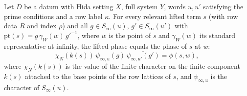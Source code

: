 \begin{proposition}\label{pf:thmS-leaves:prop:phase}
Let $D$ be a datum with Hida setting $X$, full system $Y$, words $u,u'$ satisfying the prime conditions and a row label $\kappa$. For every relevant
lifted term $s$ (with row data $R$ and index $\rho$) and all $g\in S_\infty(u)$, $g'\in S_\infty(u')$ with $\mathrm{pt}(s)=g\,\gamma_W(w)\,g'^{-1}$, where
$w$ is the point of $s$ and $\gamma_W(w)$ its standard representative at infinity, the lifted phase equals the phase of $s$ at $w$:
\[
\chi_N(k(s))\,\psi_{\infty,u}(g)\,\overline{\psi_{\infty,u'}(g')}=\phi(s,w),
\]
where $\chi_N(k(s))$ is the value of the finite character on the finite component $k(s)$ attached to the base points of the row lattices of
$s$, and $\psi_{\infty,u}$ is the character of $S_\infty(u)$.
\end{proposition}

